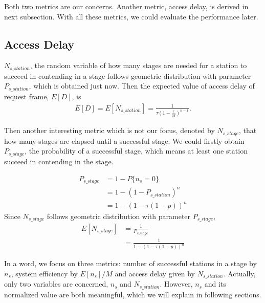 Both two metrics are our concerns. Another metric, access delay, is derived in next subsection.
With all these metrics, we could evaluate the performance later.

	
\subsection{Access Delay}
$N_{s\_station}$, the random variable of how many stages are needed for a station to succeed in contending in a stage follows geometric distribution with parameter $P_{s\_station}$, which is obtained just now.  
Then the expected value of access delay of request frame, $E[D]$, is 
\begin{align}
\label{equ_delay}
E[D] = E[N_{s\_station}] = \frac{1}{\tau (1-\frac{\tau}{M})^{n-1}}.
\end{align}

Then another interesting metric which is not our focus, denoted by $N_{s\_stage}$, that how many stages are elapsed until a successful stage. 
We could firstly obtain $P_{s\_stage}$, the probability of a successful stage, which means at least one station succeed in contending in the stage.

\begin{align}
P_{s\_stage} &= 1-P\lbrace n_s = 0\rbrace \nonumber \\
	&= 1-(1-P_{s\_station})^n \nonumber\\
	&= 1-(1-\tau(1-p))^n
\end{align} 	 
Since $N_{s\_stage}$ follows geometric distribution with parameter $P_{s\_stage}$,  
\begin{align}
E[N_{s\_stage}] &= \frac{1}{P_{s\_stage}}  \nonumber \\
			&= \frac{1}{1-(1-\tau(1-p))^n}
\end{align} 

In a word, we focus on three metrics: number of successful stations in a stage by $n_s$, system efficiency by $E[n_s]/M$ and access delay given by $N_{s\_station}$. 
Actually, only two variables are concerned, $n_s$ and $N_{s\_station}$. However, $n_s$ and its normalized value are both meaningful, which we will explain in following sections.


